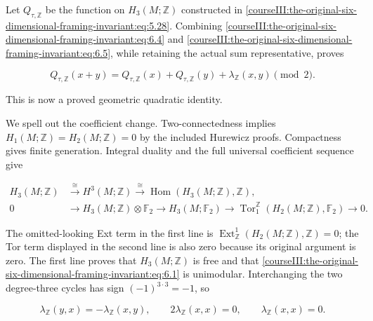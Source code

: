 Let \(Q_{\tau,\mathbb Z}\) be the function on \(H_3(M;\mathbb Z)\) constructed in \eqref{courseIII:the-original-six-dimensional-framing-invariant:eq:5.28}. Combining \eqref{courseIII:the-original-six-dimensional-framing-invariant:eq:6.4} and \eqref{courseIII:the-original-six-dimensional-framing-invariant:eq:6.5}, while retaining the actual sum representative, proves

\begin{equation}
Q_{\tau,\mathbb Z}(x+y)
   =Q_{\tau,\mathbb Z}(x)+Q_{\tau,\mathbb Z}(y)
                     +\lambda_{\mathbb Z}(x,y)\pmod2.
 \label{courseIII:the-original-six-dimensional-framing-invariant:eq:6.16}
\end{equation}

This is now a proved geometric quadratic identity.

We spell out the coefficient change. Two-connectedness implies \(H_1(M;\mathbb Z)=H_2(M;\mathbb Z)=0\) by the included Hurewicz proofs. Compactness gives finite generation. Integral duality and the full universal coefficient sequence give

\begin{equation}
\begin{split}
 H_3(M;\mathbb Z)&\xrightarrow{\ \cong\ }H^3(M;\mathbb Z)
                       \xrightarrow{\ \cong\ }
                   \operatorname{Hom}(H_3(M;\mathbb Z),\mathbb Z),\\
 0&\longrightarrow H_3(M;\mathbb Z)\otimes\mathbb F_2
       \longrightarrow H_3(M;\mathbb F_2)
       \longrightarrow
       \operatorname{Tor}_1^{\mathbb Z}(H_2(M;\mathbb Z),\mathbb F_2)
       \longrightarrow0 .
 \end{split}
 \label{courseIII:the-original-six-dimensional-framing-invariant:eq:6.17}
\end{equation}

The omitted-looking Ext term in the first line is
\(\operatorname{Ext}^1_{\mathbb Z}(H_2(M;\mathbb Z),\mathbb Z)=0\);
the Tor term displayed in the second line is also zero because its original argument is zero. The first line proves that \(H_3(M;\mathbb Z)\) is free and that \eqref{courseIII:the-original-six-dimensional-framing-invariant:eq:6.1} is unimodular. Interchanging the two degree-three cycles has sign \((-1)^{3\cdot3}=-1\), so

\begin{equation}
\lambda_{\mathbb Z}(y,x)=-\lambda_{\mathbb Z}(x,y),\qquad
 2\lambda_{\mathbb Z}(x,x)=0,\qquad
 \lambda_{\mathbb Z}(x,x)=0.
 \label{courseIII:the-original-six-dimensional-framing-invariant:eq:6.18}
\end{equation}

